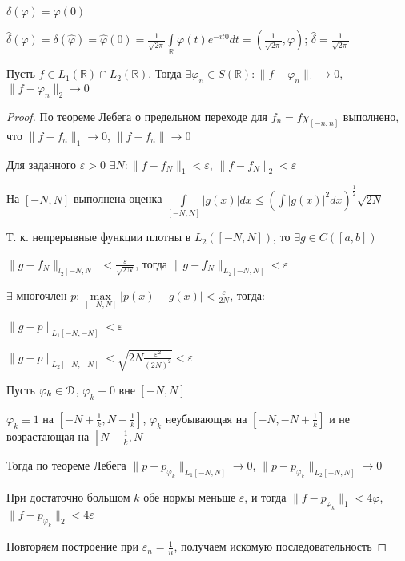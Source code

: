 \documentclass[a4paper,12pt]{report}
\begin{document}
\begin{ex}
$\delta(\varphi)=\varphi(0)$

$\hat\delta(\varphi)=\delta(\hat\varphi)=\hat\varphi(0)=\frac1{\sqrt{2\pi}}\displaystyle\int\limits_{\mathbb R}\varphi(t)e^{-it0}dt=\left(\textstyle\frac1{\sqrt{2\pi}},\varphi\right)$; $\hat\delta=\frac1{\sqrt{2\pi}}$
\end{ex}


\begin{lem}
Пусть $f\in L_1(\mathbb R)\cap L_2(\mathbb R)$. Тогда $\exists\varphi_n\in S(\mathbb R)\colon\|f-\varphi_n\|_1\to0$, $\|f-\varphi_n\|_2\to0$
\end{lem}
\begin{proof}
По теореме Лебега о предельном переходе для $f_n=f\chi_{[-n,n]}$ выполнено, что $\|f-f_n\|_1\to0$, $\|f-f_n\|\to0$

Для заданного $\varepsilon>0$ $\exists N\colon\|f-f_N\|_1<\varepsilon$, $\|f-f_N\|_2<\varepsilon$

На $[-N,N]$ выполнена оценка $\displaystyle\int\limits_{[-N,N]}|g(x)|dx\le\left(\displaystyle\int|g(x)|^2dx\right)^{\frac12}\sqrt{2N}$

Т. к. непрерывные функции плотны в $L_2([-N,N])$, то $\exists g\in C([a,b])$

$\|g-f_N\|_{l_2[-N,N]}<\frac\varepsilon{\sqrt{2N}}$, тогда $\|g-f_N\|_{L_2[-N,N]}<\varepsilon$

$\exists$ многочлен $p\colon\max\limits_{[-N,N]}|p(x)-g(x)|<\frac{\varepsilon}{2N}$, тогда: 

$\|g-p\|_{L_1[-N,-N]}<\varepsilon$

$\|g-p\|_{L_2[-N,-N]}<\sqrt{2N\frac{\varepsilon^2}{(2N)^2}}<\varepsilon$

Пусть $\varphi_k\in\EuScript D$, $\varphi_k\equiv0$ вне $[-N,N]$

$\varphi_k\equiv1$ на $\left[-N+\frac1k,N-\frac1k\right]$, $\varphi_k$ неубывающая на $\left[-N,-N+\frac1k\right]$ и не возрастающая на $\left[N-\frac1k,N\right]$

Тогда по теореме Лебега $\|p-p_{\varphi_k}\|_{L_1[-N,N]}\to0$, $\|p-p_{\varphi_k}\|_{L_2[-N,N]}\to0$

При достаточно большом $k$ обе нормы меньше $\varepsilon$, и тогда $\|f-p_{\varphi_k}\|_1<4\varphi$, $\|f-p_{\varphi_k}\|_2<4\varepsilon$

Повторяем построение при $\varepsilon_n=\frac1n$, получаем искомую последовательность
\end{proof}
\end{document}
